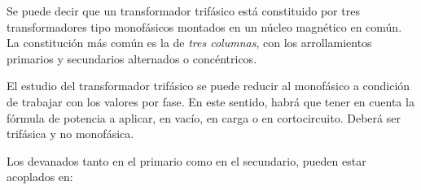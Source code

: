 \documentclass[11pt]{report}
\begin{document}
Se puede decir que un transformador trifásico está constituido por tres transformadores tipo monofásicos montados 
en un núcleo magnético en común. La constitución más común es la de \textit{tres columnas}, con los arrollamientos
primarios y secundarios alternados o concéntricos. 

El estudio del transformador trifásico se puede reducir al monofásico a condición de trabajar con los valores por fase.
En este sentido, habrá que tener en cuenta la fórmula de potencia a aplicar, en vacío, en carga o en cortocircuito. Deberá 
ser trifásica y no monofásica.

Los devanados tanto en el primario como en el secundario, pueden estar acoplados en:
\end{document}
